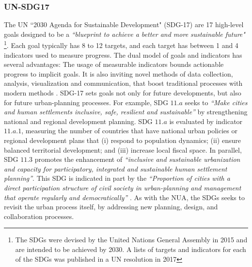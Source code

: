 {{        \subsubsection{UN-SDG17}\label{subsec:un-sdg}
        {
            The UN ``2030 Agenda for Sustainable Development" (SDG-17) \cite{assembly2015transforming} are 17 high-level goals designed to be a \textit{``blueprint to achieve a better and more sustainable future"} \cite{assembly2015transforming}\footnote{The SDGs were devised by the United Nations General Assembly in 2015 and are intended to be achieved by 2030. A lists of targets and indicators for each of the SDGs was published in a UN resolution in 2017}. Each goal typically has 8 to 12 targets, and each target has between 1 and 4 indicators used to measure progress. The dual model of goals and indicators has several advantages: The usage of measurable indicators bounds actionable progress to implicit goals. It is also inviting novel methods of data collection, analysis, visualization and communication, that boost traditional processes with modern methods \cite{Klopp2017}.
            \newline
            SDG-17 sets goals not only for future developments, but also for future urban-planning processes. For example, SDG $11.a$ seeks to \textit{``Make cities and human settlements inclusive, safe, resilient and sustainable''} by strengthening national and regional development planning. SDG $11.a$ is evaluated by indicator $11.a.1$, measuring the number of countries that have national urban policies or regional development plans that (i) respond to population dynamics; (ii) ensure balanced territorial development; and (iii) increase local fiscal space. In parallel, SDG $11.3$ promotes the enhancement of \textit{``inclusive and sustainable urbanization and capacity for participatory, integrated and sustainable human settlement planning''}. This SDG is indicated in part by the \textit{``Proportion of cities with a direct participation structure of civil society in urban-planning and management that operate regularly and democratically''} \cite{assembly2015transforming}. As with the NUA, the SDGs seeks to revisit the urban process itself, by addressing new planning, design, and collaboration processes.
        }

}}

